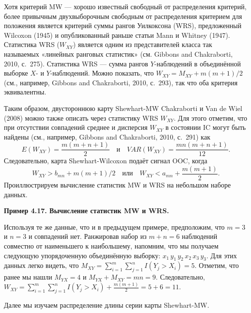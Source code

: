 Хотя критерий MW --- хорошо известный свободный от распределения критерий, более привычным двухвыборочным свободным от распределения критерием для положения является критерий суммы рангов Уилкоксона (WRS), предложенный Wilcoxon (1945) и опубликованный раньше статьи Mann и Whitney (1947). Статистика WRS (\(W_{XY}\)) является одним из представителей класса так называемых «линейных ранговых статистик» (см. Gibbons and Chakraborti, 2010, с.~275). Статистика WRS --- сумма рангов \(Y\)-наблюдений в объединённой выборке \(X\)- и \(Y\)-наблюдений. Можно показать, что \(W_{XY} = M_{XY} + m(m + 1)/2\) (см., например, Gibbons and Chakraborti, 2010, с.~293), так что оба критерия эквивалентны.

Таким образом, двустороннюю карту Shewhart-MW Chakraborti и Van de Wiel (2008) можно также описать через статистику WRS \(W_{XY}\). Для этого отметим, что при отсутствии совпадений среднее и дисперсия \(W_{XY}\) в состоянии IC могут быть найдены (см., например, Gibbons and Chakraborti, 2010, с.~291) как
\begin{equation}
	E(W_{XY}) = \frac{m(m + n + 1)}{2} \quad \text{и} \quad VAR(W_{XY}) = \frac{mn(m + n + 1)}{12}.
	\label{eq:4.45}
\end{equation}
Следовательно, карта Shewhart-Wilcoxon подаёт сигнал OOC, когда
\[
	W_{XY} > b_{mn} + m(m + 1)/2 \quad \text{или} \quad W_{XY} < a_{mn} + \frac{m(m + 1)}{2}.
\]
Проиллюстрируем вычисление статистик MW и WRS на небольшом наборе данных.

\noindent\textbf{Пример 4.17. Вычисление статистик MW и WRS.}

Используя те же данные, что и в предыдущем примере, предположим, что \(m = 3\) и \(n = 3\) и совпадений нет. Ранжировав набор из \(m + n = 6\) наблюдений совместно от наименьшего к наибольшему, напомним, что мы получаем следующую упорядоченную объединённую выборку: \(x_1\, y_1\, y_2\, x_2\, x_3\, y_3\). Для этих данных легко видеть, что \(M_{XY} = \sum_{i=1}^{m}\sum_{j=1}^{n} I\left( Y_j > X_i \right) = 5\). Отметим, что ранее мы нашли \(M_{YX} = 4\) и \(M_{YX} + M_{XY} = mn = 9\). Следовательно, \(W_{XY} = \sum_{i=1}^{m}\sum_{j=1}^{n} I\left( Y_j > X_i \right) + \frac{m(m + 1)}{2} = 5 + 6 = 11\).

Далее мы изучаем распределение длины серии карты Shewhart-MW.

